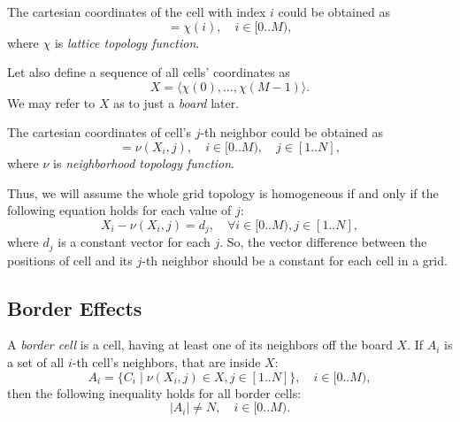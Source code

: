 \documentclass[a4paper,12pt,tikz,UTF8]{article}
\begin{document}
    The cartesian coordinates of the cell with index $i$ could be obtained as 
    \begin{equation}
      [ x_0, ..., x_{D - 1} ] = \chi(i), \quad i \in {[0 .. M)},
    \end{equation}
    where $\chi$ is \textit{lattice topology function}. 

    Let also define a sequence of all cells' coordinates as 
    \begin{equation}
      X = \langle \chi(0), ..., \chi(M - 1) \rangle.
    \end{equation}
    We may refer to $X$ as to just a \textit{board} later.

    The cartesian coordinates of cell's $j$-th neighbor could be obtained as
    \begin{equation}
      [ x_0, ..., x_{D - 1} ] = \nu(X_i, j), \quad i \in {[0 .. M)}, \quad j \in {[1 .. N]},
    \end{equation}
    where $\nu$ is \textit{neighborhood topology function}. 

    Thus, we will assume the whole grid topology is homogeneous if and only if the following equation holds for each value of $j$:
    \begin{equation}
      X_i - \nu(X_i, j) = d_j, \quad \forall i \in {[0 .. M)}, j \in [1 .. N],
    \end{equation}
    where $d_j$ is a constant vector for each $j$. So, the vector difference between the positions of cell and its $j$-th neighbor should be a constant for each cell in a grid.

  \subsection {Border Effects}

    A \textit{border cell} is a cell, having at least one of its neighbors off the board $X$. If $A_i$ is a set of all $i$-th cell's neighbors, that are inside $X$:
    \begin{equation}
      A_i = \{ C_i \mid \nu(X_i, j) \in X, j \in [1 .. N] \}, \quad i \in {[0 .. M)},
    \end{equation}
    then the following inequality holds for all border cells:
    \begin{equation}
      | A_i | \neq N, \quad i \in [0 .. M).
    \end{equation}
\end{document}
